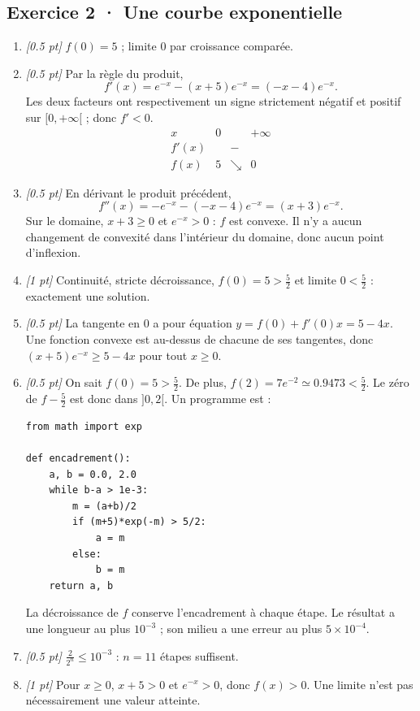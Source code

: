 \subsection*{Exercice 2 · Une courbe exponentielle}\begin{enumerate}

\item \textit{[\num{0,5} pt]} $f(0)=5$ ; limite $0$ par croissance comparée.

\item \textit{[\num{0,5} pt]} Par la règle du produit,
\[f'(x)=e^{-x}-(x+5)e^{-x}=(-x-4)e^{-x}.\]
Les deux facteurs ont respectivement un signe strictement négatif et positif sur $[0,+\infty[$ ; donc $f'<0$.
\[\begin{array}{c|ccc}x&0&&+\infty\\\hline f'(x)&&-&\\\hline f(x)&5&\searrow&0\end{array}\]

\item \textit{[\num{0,5} pt]} En dérivant le produit précédent,
\[f''(x)=-e^{-x}-(-x-4)e^{-x}=(x+3)e^{-x}.\]
Sur le domaine, $x+3\ge0$ et $e^{-x}>0$ : $f$ est convexe. Il n'y a aucun changement de convexité dans l'intérieur du domaine, donc aucun point d'inflexion.

\item \textit{[1 pt]} Continuité, stricte décroissance, $f(0)=5>\frac{5}{2}$ et limite $0<\frac{5}{2}$ : exactement une solution.

\item \textit{[\num{0,5} pt]} La tangente en $0$ a pour équation $y=f(0)+f'(0)x=5-4x$. Une fonction convexe est au-dessus de chacune de ses tangentes, donc $(x+5)e^{-x}\ge 5-4x$ pour tout $x\ge0$.


\item \textit{[\num{0,5} pt]} On sait $f(0)=5>\frac{5}{2}$. De plus, $f(2)=7e^{-2}\simeq\num{0,9473}<\frac{5}{2}$. Le zéro de $f-\frac{5}{2}$ est donc dans $]0,2[$. Un programme est :
\begin{lstlisting}
from math import exp

def encadrement():
    a, b = 0.0, 2.0
    while b-a > 1e-3:
        m = (a+b)/2
        if (m+5)*exp(-m) > 5/2:
            a = m
        else:
            b = m
    return a, b
\end{lstlisting}
La décroissance de $f$ conserve l'encadrement à chaque étape. Le résultat a une longueur au plus $10^{-3}$ ; son milieu a une erreur au plus $5\times10^{-4}$.

\item \textit{[\num{0,5} pt]} $\frac{2}{2^n}\le10^{-3}$ : $n=11$ étapes suffisent.

\item \textit{[1 pt]} Pour $x\ge0$, $x+5>0$ et $e^{-x}>0$, donc $f(x)>0$. Une limite n'est pas nécessairement une valeur atteinte.

\end{enumerate}


